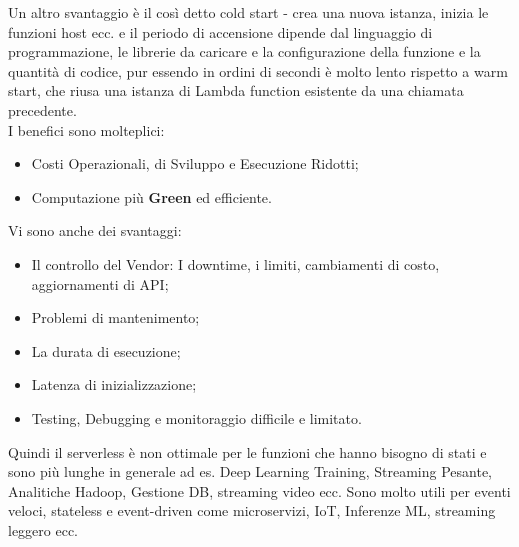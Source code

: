 \documentclass[11pt, twocolumn]{article}
\newenvironment{myitemize}
{ \begin{itemize}[topsep=0ex]
		\setlength{\itemsep}{0pt}
		\setlength{\parskip}{0pt}
		\setlength{\parsep}{0pt}     }
	{ \end{itemize}                  }
\begin{document}
Un altro svantaggio è il così detto cold start - crea una nuova istanza, inizia le funzioni host ecc. e il periodo di accensione dipende dal linguaggio di programmazione, le librerie da caricare e la configurazione della funzione e la quantità di codice, pur essendo in ordini di secondi è molto lento rispetto a warm start, che riusa una istanza di Lambda function esistente da una chiamata precedente.\\
I benefici sono molteplici:
\begin{myitemize}
	\item Costi Operazionali, di Sviluppo e Esecuzione Ridotti;
	\item Computazione più \textcolor{OliveGreen}{\textbf{Green}} ed efficiente.
\end{myitemize}
Vi sono anche dei svantaggi:
\begin{myitemize}
	\item Il controllo del Vendor: I downtime, i limiti, cambiamenti di costo, aggiornamenti di API;
	\item Problemi di mantenimento;
	\item La durata di esecuzione;
	\item Latenza di inizializzazione;
	\item Testing, Debugging e monitoraggio difficile e limitato.
\end{myitemize}
Quindi il serverless è non ottimale per le funzioni che hanno bisogno di stati e sono più lunghe in generale ad es. Deep Learning Training, Streaming Pesante, Analitiche Hadoop, Gestione DB, streaming video ecc. Sono molto utili per eventi veloci, stateless e event-driven come microservizi, IoT, Inferenze ML, streaming leggero ecc.
\end{document}
